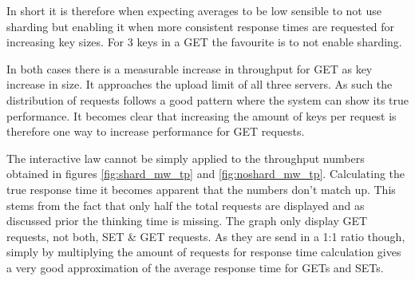         In short it is therefore when expecting averages to be low sensible to not use sharding but enabling it when
        more consistent response times are requested for increasing key sizes. For 3 keys in a GET the favourite is to
        not enable sharding.

        In both cases there is a measurable increase in throughput for GET as key increase in size. It approaches the
        upload limit of all three servers. As such the distribution of requests follows a good pattern where the system
        can show its true performance. It becomes clear that increasing the amount of keys per request is therefore one
        way to increase performance for GET requests.

        The interactive law cannot be simply applied to the throughput numbers obtained in figures \ref{fig:shard_mw_tp}
        and \ref{fig:noshard_mw_tp}. Calculating the true response time it becomes apparent that the numbers don't match up.
        This stems from the fact that only half the total requests are displayed and as discussed prior the thinking
        time is missing. The graph only display GET requests, not both, SET \& GET requests. As they are send in a 1:1
        ratio though, simply by multiplying the amount of requests for response time calculation gives a very good
        approximation of the average response time for GETs and SETs.
